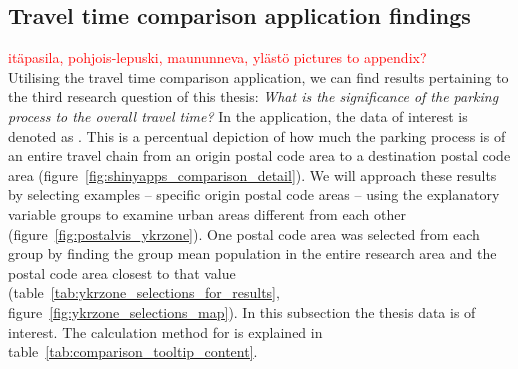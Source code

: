 \newpage
\subsection{Travel time comparison application findings}
\justify

\textcolor{red}{itäpasila, pohjois-lepuski, maununneva, ylästö pictures to appendix?}\\
Utilising the travel time comparison application, we can find results pertaining to the third research question of this thesis: \textit{What is the significance of the parking process to the overall travel time?} In the application, the data of interest is denoted as . This is a percentual depiction of how much the parking process is of an entire travel chain from an origin postal code area to a destination postal code area (figure~\ref{fig:shinyapps_comparison_detail}). We will approach these results by selecting examples -- specific origin postal code areas -- using the explanatory variable  groups to examine urban areas different from each other (figure~\ref{fig:postalvis_ykrzone}). One postal code area was selected from each  group by finding the group mean population in the entire research area and the postal code area closest to that value (table~\ref{tab:ykrzone_selections_for_results}, figure~\ref{fig:ykrzone_selections_map}). In this subsection the thesis data  is of interest. The calculation method for  is explained in table~\ref{tab:comparison_tooltip_content}.

